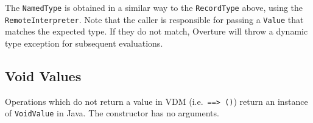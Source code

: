 \documentclass{overturerepchap}
\begin{document}
The \texttt{NamedType} is obtained in a similar way to the \texttt{RecordType} above, using the \texttt{Remote\-Interpreter}. Note that the caller is responsible for passing a \texttt{Value} that matches the expected type. If they do not match, Overture will throw a dynamic type exception for subsequent evaluations.

\subsection{Void Values}

Operations which do not return a value in VDM (i.e.\ \texttt{==> ()}) return an instance of \texttt{VoidValue} in Java. The constructor has no arguments.

\newpage%
\label{sec:index}
\printindex
\end{document}
